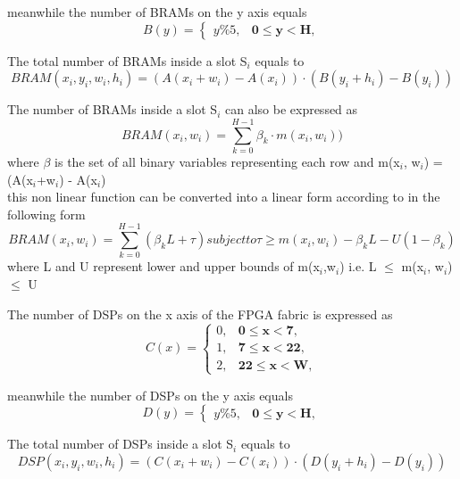 \documentclass[conference]{IEEEtran}
\begin{document}
meanwhile the number of BRAMs on the y axis equals 
\begin{equation}
B(y) = \begin{cases}
y\%5, & \textbf{0$\leq$y$<$H},
\end{cases}
\end{equation}

The total number of BRAMs inside a slot S$_i$ equals to \\
\begin{equation}
BRAM(x_i,y_i,w_i,h_i) =  (A(x_i+w_i) - A(x_i)) \cdot (B(y_i+h_i) - B(y_i))
\end{equation}

The number of BRAMs inside a slot S$_i$ can also be expressed as 
\begin{equation}
BRAM(x_i, w_i) = \sum_{k=0}^{H-1} \beta_k \cdot m(x_i, w_i))
\end{equation}
where $\beta$ is the set of all binary variables representing each row and m(x$_i$, w$_i$) = (A(x$_i$+w$_i$) - A(x$_i$) \\

this non linear function can be converted into a linear form according to \cite{1} in the following form
\begin{equation}
BRAM(x_i,w_i) = \sum_{k=0}^{H-1} (\beta_k L + \tau)
subject to
\tau \geq m(x_i, w_i)- \beta_k L -U(1-\beta_k)
\end{equation}
where L and U represent lower and upper bounds of m(x$_i$,w$_i$) i.e. L $\leq$ m(x$_i$, w$_i$) $\leq$ U

The number of DSPs on the x axis of the FPGA fabric is expressed as 
\begin{equation}
C(x) = \begin{cases}
0, & \textbf{0$\leq$x$<$7}, \\
1, & \textbf{7$\leq$x$<$22}, \\
2, & \textbf{22$\leq$x$<$W},
\end{cases}
\end{equation}

meanwhile the number of DSPs on the y axis equals 
\begin{equation}
D(y) = \begin{cases} 
y\%5, & \textbf{0$\leq$y$<$H},
\end{cases}
\end{equation}

The total number of DSPs inside a slot S$_i$ equals to \\
\begin{equation}
DSP(x_i,y_i,w_i,h_i) =  (C(x_i+w_i) - C(x_i)) \cdot (D(y_i+h_i) - D(y_i))
\end{equation}					  
\end{document}
